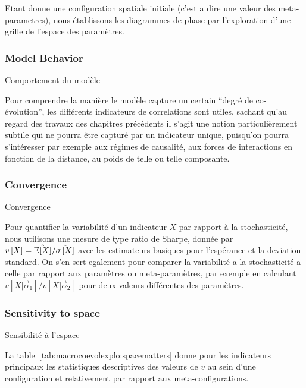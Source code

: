 Etant donne une configuration spatiale initiale (c'est a dire une valeur des meta-parametres), nous établissons les diagrammes de phase par l'exploration d'une grille de l'espace des paramètres.


\subsubsection{Model Behavior}{Comportement du modèle}


Pour comprendre la manière le modèle capture un certain ``degré de co-évolution'', les différents indicateurs de correlations sont utiles, sachant qu'au regard des travaux des chapitres précédents il s'agit une notion particulièrement subtile qui ne pourra être capturé par un indicateur unique, puisqu'on pourra s'intéresser par exemple aux régimes de causalité, aux forces de interactions en fonction de la distance, au poids de telle ou telle composante.


\subsubsection{Convergence}{Convergence}


Pour quantifier la variabilité d'un indicateur $X$ par rapport à la stochasticité, nous utilisons une mesure de type ratio de Sharpe, donnée par $v\left[X\right] = \hat{\operatorname{\mathbb{E}}\!\left[X\right]}/\hat{\sigma\left[X\right]}$ avec les estimateurs basiques pour l'espérance et la deviation standard. On s'en sert egalement pour comparer la variabilité a la stochasticité a celle par rapport aux paramètres ou meta-paramètres, par exemple en calculant $v\left[X|\vec{\alpha}_1\right]/v\left[X|\vec{\alpha}_2\right]$ pour deux valeurs différentes des paramètres.





\subsubsection{Sensitivity to space}{Sensibilité à l'espace}

La table~\ref{tab:macrocoevolexplo:spacematters} donne pour les indicateurs principaux les statistiques descriptives des valeurs de $v$ au sein d'une configuration et relativement par rapport aux meta-configurations.


